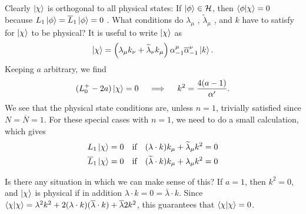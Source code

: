Clearly $\ket{\chi}$ is orthogonal to all physical states:
If $\ket{\phi} \in \mathcal{H}$, then $\bra{\phi} \ket{\chi} = 0$ because $L_1 \ket{\phi} = \overline{L}_1 \ket{\phi} = 0$ .
What conditions do $\lambda_{\mu}$ , $\widetilde{\lambda}_{\mu}$ , and $k$  have to satisfy for $\ket{\chi}$  to be physical?
It is useful to write $\ket{\chi}$  as 
\begin{equation}
  \ket{\chi} = \left( \lambda_{\mu} k_{\nu} + \widetilde{\lambda}_{\nu} k_{\mu} \right) \alpha^{\mu}_{-1} \overline{\alpha}{}^{\nu}_{-1} \ket{k}.
\end{equation}
Keeping $a$  arbitrary, we find
\begin{equation}
  (L^+_0 -2a) \ket{\chi} = 0 \quad \implies \quad k^2 = \frac{4 (a-1)}{\alpha'}.
\end{equation} 
We see that the physical state conditions are, unless $n = 1$, trivially satisfied since $N = \overline{N} = 1$. For these special cases with $n = 1$, we need to do a small calculation, which gives
\begin{align}
  L_1 \ket{\chi} &= 0 & \text{if} \quad (\lambda \cdot k) k_{\mu} + \widetilde{\lambda}_{\mu} k^2 &= 0 \\
  \overline{L}_1 \ket{\chi} &= 0 & \text{if} \quad (\widetilde{\lambda} \cdot k) k_{\mu} + \lambda_{\mu} k^2 &= 0
\end{align}

Is there any situation in which we can make sense of this?
If $a = 1$, then $k^2 = 0$, and $\ket{\chi}$ is physical if in addition $\lambda \cdot k = 0 = \overline{\lambda} \cdot k$. 
Since $\bra{\chi} \ket{\chi} =  \lambda^2 k^2 + 2 ( \lambda \cdot k) (\overline{\lambda} \cdot k) + \overline{\lambda}{2} k^2$, this guarantees that $\bra{\chi} \ket{\chi} = 0$.
